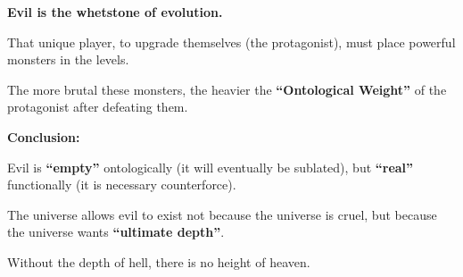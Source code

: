 \textbf{Evil is the whetstone of evolution.}

That unique player, to upgrade themselves (the protagonist), must place powerful monsters in the levels.

The more brutal these monsters, the heavier the \textbf{``Ontological Weight''} of the protagonist after defeating them.

\textbf{Conclusion:}

Evil is \textbf{``empty''} ontologically (it will eventually be sublated), but \textbf{``real''} functionally (it is necessary counterforce).

The universe allows evil to exist not because the universe is cruel, but because the universe wants \textbf{``ultimate depth''}.

Without the depth of hell, there is no height of heaven.

